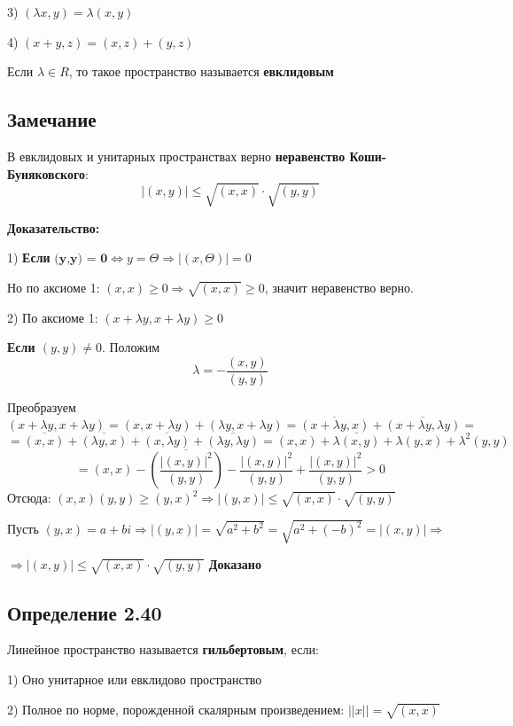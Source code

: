 \documentclass[12pt]{article}
\begin{document}
	3) $(\lambda x, y) = \lambda (x, y)$
	
	4) $(x + y, z) = (x, z)+(y, z)$

	Если $\lambda \in R$, то такое пространство называется \textbf{евклидовым}
	
	
	
\subsection{Замечание}

	В евклидовых и унитарных пространствах верно \textbf{неравенство Коши-Буняковского}:
	$$|(x,y)| \leq \sqrt{(x,x)} \cdot \sqrt{(y,y)} $$
	
\textbf{Доказательство:}
		


1)	\textbf{Если} $\textbf{(y,y) = 0} \Leftrightarrow y = \Theta \Rightarrow |(x,\Theta)| = 0$	
		
		Но по аксиоме 1: $(x,x) \ge 0 \Rightarrow \sqrt{(x,x)} \ge 0$, значит неравенство верно.
		
2)		По аксиоме 1:
		$(x + \lambda y , x + \lambda y) \ge 0$
		
	\textbf{Если $(y,y) \neq 0$}. Положим 
$$\lambda = -\frac{(x,y)}{(y,y)}$$

Преобразуем
	$$(x + \lambda y , x + \lambda y) = (x , x + \lambda y) + (\lambda y , x + \lambda y) 	= 
	\overline{(x + \lambda y , x)} + \overline{(x + \lambda y , \lambda y)} =
	$$
$$ = \overline{(x,x)} + \overline{(\lambda y ,x)} + 
\overline{(x, \lambda y)} + \overline{(\lambda y , \lambda y)} = (x,x) + \overline{\lambda(x, y)} + \lambda( y , x) + \lambda^2 (y,y)
$$
$$
= (x,x) - \overline{(\frac{|(x,y)|^2}{(y,y)})} - \frac{|(x,y)|^2}{(y,y)} + \frac{|(x,y)|^2}{(y,y)} > 0
$$
Отсюда:
$(x,x)(y,y) \ge (y,x)^2 \Rightarrow |(y,x)| \leq \sqrt{(x,x)} \cdot \sqrt{(y,y)} $

Пусть $(y,x) = a + bi \Rightarrow |(y,x)| = \sqrt{a^2 + b^2}=  \sqrt{a^2 + (-b)^2} = |(x,y)| \Rightarrow$

$ \Rightarrow |(x,y)| \leq \sqrt{(x,x)} \cdot \sqrt{(y,y)}$ \textbf{Доказано}

\subsection{Определение 2.40}
	Линейное пространство называется \textbf{гильбертовым}, если:
	
	1) Оно унитарное или евклидово пространство
	
	2) Полное по норме, порожденной скалярным произведением: 
	$||x|| = \sqrt{(x,x)} $
\end{document}
